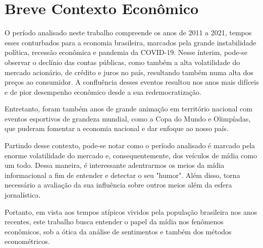 \section{Breve Contexto Econômico}

O período analisado neste trabalho compreende os anos de 2011 a 2021, tempos esses conturbados para a economia brasileira, marcados pela grande instabilidade política, recessão econômica e pandemia da COVID-19. Nesse ínterim, pode-se observar o declínio das contas públicas, como também a alta volatilidade do mercado acionário, de crédito e juros no país, resultando também numa alta dos preços ao consumidor. A confluência desses eventos resultou nos anos mais difíceis e de pior desempenho econômico desde a sua redemocratização.

Entretanto, foram também anos de grande animação em território nacional com eventos esportivos de grandeza mundial, como a Copa do Mundo e Olimpíadas, que puderam fomentar a economia nacional e dar enfoque ao nosso país.

Partindo desse contexto, pode-se notar como o período analisado é marcado pela enorme volatilidade do mercado e, consequentemente, dos veículos de mídia como um todo. Dessa maneira, é interessante adentrarmos os meios da mídia informacional a fim de entender e detectar o seu "humor". Além disso, torna necessário a avaliação da sua influência sobre outros meios além da esfera jornalística.

Portanto, em vista aos tempos atípicos vividos pela população brasileira nos anos recentes, este trabalho busca entender o papel da mídia nos fenômenos econômicos, sob a ótica da análise de sentimentos e também dos métodos econométricos.




